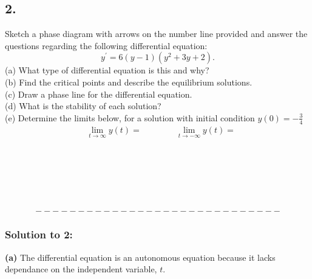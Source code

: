 \documentclass[a4paper,12pt]{article}
\begin{document}
\subsection*{2.} 
Sketch a phase diagram with arrows on the number line provided and answer the questions regarding the following differential equation:
$$ y^{\prime} = 6(y-1)(y^2+3y+2). $$
(a) What type of differential equation is this and why?\\
(b) Find the critical points and describe the equilibrium solutions.\\
(c) Draw a phase line for the differential equation.\\
(d) What is the stability of each solution?\\
(e) Determine the limits below, for a solution with initial condition $y(0)=-\frac{3}{4}$
$$
\begin{aligned}
& \lim _{t \rightarrow \infty} y(t)=  \quad\quad\quad\quad \lim _{t \rightarrow-\infty} y(t)=
\end{aligned}
$$\\
\\
\\
\\
\\
\\

$$ ----------------------------- $$
\pagebreak

\subsubsection*{Solution to 2:}
\textbf{(a)} The differential equation is an autonomous equation because it lacks dependance on the independent variable, $t$.\\
\end{document}
